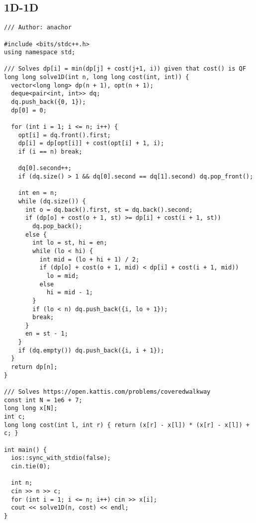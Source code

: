 \documentclass[FSZ,a4paper,onesided]{article}
\begin{document}
\begin{multicols*}{\COLS}
\subsection{1D-1D}
\begin{lstlisting}
/// Author: anachor

#include <bits/stdc++.h>
using namespace std;

/// Solves dp[i] = min(dp[j] + cost(j+1, i)) given that cost() is QF
long long solve1D(int n, long long cost(int, int)) {
  vector<long long> dp(n + 1), opt(n + 1);
  deque<pair<int, int>> dq;
  dq.push_back({0, 1});
  dp[0] = 0;

  for (int i = 1; i <= n; i++) {
    opt[i] = dq.front().first;
    dp[i] = dp[opt[i]] + cost(opt[i] + 1, i);
    if (i == n) break;

    dq[0].second++;
    if (dq.size() > 1 && dq[0].second == dq[1].second) dq.pop_front();

    int en = n;
    while (dq.size()) {
      int o = dq.back().first, st = dq.back().second;
      if (dp[o] + cost(o + 1, st) >= dp[i] + cost(i + 1, st))
        dq.pop_back();
      else {
        int lo = st, hi = en;
        while (lo < hi) {
          int mid = (lo + hi + 1) / 2;
          if (dp[o] + cost(o + 1, mid) < dp[i] + cost(i + 1, mid))
            lo = mid;
          else
            hi = mid - 1;
        }
        if (lo < n) dq.push_back({i, lo + 1});
        break;
      }
      en = st - 1;
    }
    if (dq.empty()) dq.push_back({i, i + 1});
  }
  return dp[n];
}

/// Solves https://open.kattis.com/problems/coveredwalkway
const int N = 1e6 + 7;
long long x[N];
int c;
long long cost(int l, int r) { return (x[r] - x[l]) * (x[r] - x[l]) + c; }

int main() {
  ios::sync_with_stdio(false);
  cin.tie(0);

  int n;
  cin >> n >> c;
  for (int i = 1; i <= n; i++) cin >> x[i];
  cout << solve1D(n, cost) << endl;
}
\end{lstlisting}

\end{multicols*}
\end{document}
